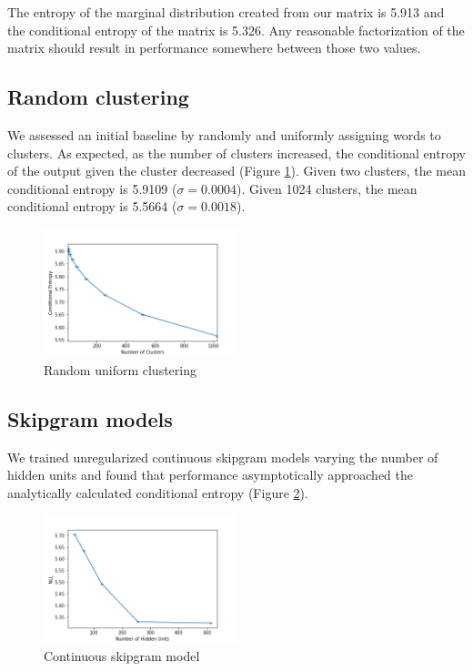 \documentclass[11pt,letterpaper]{article}
\begin{document}
The entropy of the marginal distribution created from our matrix is 5.913 and the conditional entropy of the matrix is 5.326. Any reasonable factorization of the matrix should result in performance somewhere between those two values.

\subsection{Random clustering}

We assessed an initial baseline by randomly and uniformly assigning words to clusters. As expected, as the number of clusters increased, the conditional entropy of the output given the cluster decreased (Figure \ref{f:random}). Given two clusters, the mean conditional entropy is 5.9109 ($\sigma=0.0004$). Given 1024 clusters, the mean conditional entropy is 5.5664 ($\sigma=0.0018$).

\begin{figure}
  \caption{Random uniform clustering}
\label{f:random}
  \centering
    \includegraphics[width=0.5\textwidth]{random.png}
\end{figure}

\subsection{Skipgram models}

We trained unregularized continuous skipgram models varying the number of hidden units and found that performance asymptotically approached the analytically calculated conditional entropy (Figure \ref{f:baseline}). 

\begin{figure}
  \caption{Continuous skipgram model}
\label{f:baseline}
  \centering
    \includegraphics[width=0.5\textwidth]{baseline.png}
\end{figure}
\end{document}
